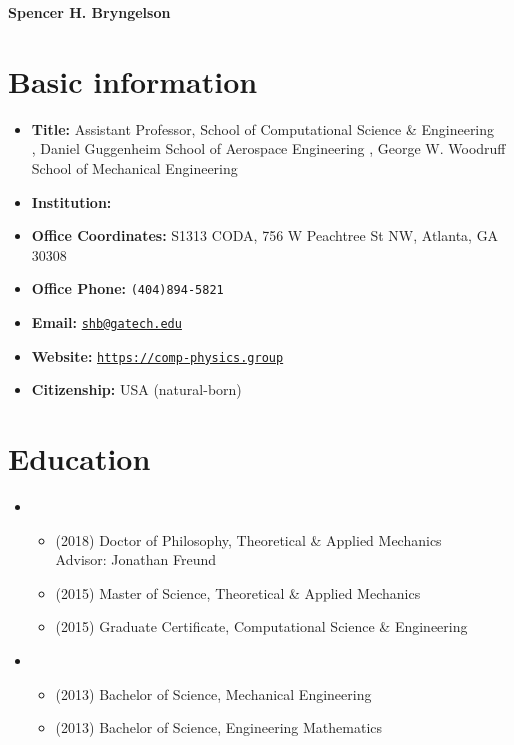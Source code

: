 




\begin{center}
    {\LARGE \bf Spencer H. Bryngelson} 
\end{center}


\section{Basic information}
\begin{itemize}
    \item[] \textbf{Title:} Assistant Professor, School of Computational Science \& Engineering \\
         \APBC, Daniel Guggenheim School of Aerospace Engineering 
         \APBC, George W. Woodruff School of Mechanical Engineering
    \item[] \textbf{Institution:} \GIT
    \item[] \textbf{Office Coordinates:} S1313 CODA, 756 W Peachtree St NW, Atlanta, GA 30308
    \item[] \textbf{Office Phone:} \texttt{(404)894-5821}
    \item[] \textbf{Email:} \href{mailto:shb@gatech.edu}{\texttt{shb@gatech.edu}}
    \item[] \textbf{Website:} \href{https://comp-physics.group}{\texttt{https://comp-physics.group}}
    \item[] \textbf{Citizenship:} USA (natural-born)
\end{itemize}

\section{Education}

\begin{itemize}
    \item \UIUC
    \begin{itemize}
        \item[] (2018) Doctor of Philosophy, Theoretical \& Applied Mechanics \\
            \phantom{(2018)} Advisor: Jonathan Freund
        \item[] (2015) Master of Science, Theoretical \& Applied Mechanics
        \item[] (2015) Graduate Certificate, Computational Science \& Engineering
    \end{itemize}
    \item \UMD
    \begin{itemize}
        \item[] (2013) Bachelor of Science, Mechanical Engineering
        \item[] (2013) Bachelor of Science, Engineering Mathematics
    \end{itemize}
\end{itemize}


